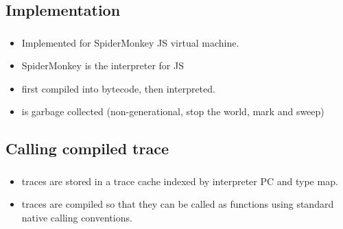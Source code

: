 \documentclass[mathserif,10pt]{beamer}
\begin{document}
\subsection{Implementation}
\frame
{
  \frametitle{\subsecname}
  \begin{itemize}
    \item Implemented for SpiderMonkey JS virtual machine.
    \item SpiderMonkey is the interpreter for JS
    \item first compiled into bytecode, then interpreted.
    \item is garbage collected (non-generational, stop the world, mark and sweep)
  \end{itemize}  
}
\subsection{Calling compiled trace}
\frame
{
  \frametitle{\subsecname}
  \begin{itemize}
    \item traces are stored in a trace cache indexed by interpreter PC and type map.
    \item traces are compiled so that they can be called as functions using standard native calling conventions.
  \end{itemize}  
}
\end{document}
